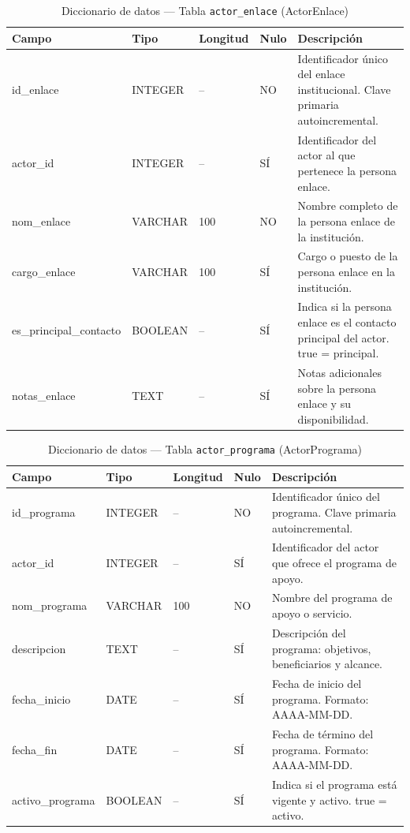 \begin{table}[H]
	\centering
	\caption{Diccionario de datos --- Tabla \texttt{actor\_enlace} (ActorEnlace)}
	\label{tab:data-dict-actor_enlace}
	\scriptsize
	\begin{tabular}{>{\ttfamily\raggedright\arraybackslash}p{3.6cm} p{1.6cm} p{1.3cm} p{0.7cm} p{5.6cm}}
		\toprule
		\textbf{Campo} & \textbf{Tipo} & \textbf{Longitud} & \textbf{Nulo} & \textbf{Descripción} \\
		\midrule
		id\_enlace & INTEGER & -- & NO & Identificador único del enlace institucional. Clave primaria autoincremental. \\
		actor\_id & INTEGER & -- & SÍ & Identificador del actor al que pertenece la persona enlace. \\
		nom\_enlace & VARCHAR & 100 & NO & Nombre completo de la persona enlace de la institución. \\
		cargo\_enlace & VARCHAR & 100 & SÍ & Cargo o puesto de la persona enlace en la institución. \\
		es\_principal\_contacto & BOOLEAN & -- & SÍ & Indica si la persona enlace es el contacto principal del actor. true = principal. \\
		notas\_enlace & TEXT & -- & SÍ & Notas adicionales sobre la persona enlace y su disponibilidad. \\
		\bottomrule
	\end{tabular}
\end{table}

\begin{table}[H]
	\centering
	\caption{Diccionario de datos --- Tabla \texttt{actor\_programa} (ActorPrograma)}
	\label{tab:data-dict-actor_programa}
	\scriptsize
	\begin{tabular}{>{\ttfamily\raggedright\arraybackslash}p{3.6cm} p{1.6cm} p{1.3cm} p{0.7cm} p{5.6cm}}
		\toprule
		\textbf{Campo} & \textbf{Tipo} & \textbf{Longitud} & \textbf{Nulo} & \textbf{Descripción} \\
		\midrule
		id\_programa & INTEGER & -- & NO & Identificador único del programa. Clave primaria autoincremental. \\
		actor\_id & INTEGER & -- & SÍ & Identificador del actor que ofrece el programa de apoyo. \\
		nom\_programa & VARCHAR & 100 & NO & Nombre del programa de apoyo o servicio. \\
		descripcion & TEXT & -- & SÍ & Descripción del programa: objetivos, beneficiarios y alcance. \\
		fecha\_inicio & DATE & -- & SÍ & Fecha de inicio del programa. Formato: AAAA-MM-DD. \\
		fecha\_fin & DATE & -- & SÍ & Fecha de término del programa. Formato: AAAA-MM-DD. \\
		activo\_programa & BOOLEAN & -- & SÍ & Indica si el programa está vigente y activo. true = activo. \\
		\bottomrule
	\end{tabular}
\end{table}


